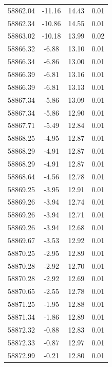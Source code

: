 \begin{longtable}{|c|c|c|c|}
 58862.04 &  -11.16 &       14.43 &          0.01 \\
 58862.34 &  -10.86 &       14.55 &          0.01 \\
 58863.02 &  -10.18 &       13.99 &          0.02 \\
 58866.32 &   -6.88 &       13.10 &          0.01 \\
 58866.34 &   -6.86 &       13.00 &          0.01 \\
 58866.39 &   -6.81 &       13.16 &          0.01 \\
 58866.39 &   -6.81 &       13.13 &          0.01 \\
 58867.34 &   -5.86 &       13.09 &          0.01 \\
 58867.34 &   -5.86 &       12.90 &          0.01 \\
 58867.71 &   -5.49 &       12.84 &          0.01 \\
 58868.25 &   -4.95 &       12.87 &          0.01 \\
 58868.29 &   -4.91 &       12.87 &          0.01 \\
 58868.29 &   -4.91 &       12.87 &          0.01 \\
 58868.64 &   -4.56 &       12.78 &          0.01 \\
 58869.25 &   -3.95 &       12.91 &          0.01 \\
 58869.26 &   -3.94 &       12.74 &          0.01 \\
 58869.26 &   -3.94 &       12.71 &          0.01 \\
 58869.26 &   -3.94 &       12.68 &          0.01 \\
 58869.67 &   -3.53 &       12.92 &          0.01 \\
 58870.25 &   -2.95 &       12.89 &          0.01 \\
 58870.28 &   -2.92 &       12.70 &          0.01 \\
 58870.28 &   -2.92 &       12.69 &          0.01 \\
 58870.65 &   -2.55 &       12.78 &          0.01 \\
 58871.25 &   -1.95 &       12.88 &          0.01 \\
 58871.34 &   -1.86 &       12.89 &          0.01 \\
 58872.32 &   -0.88 &       12.83 &          0.01 \\
 58872.33 &   -0.87 &       12.97 &          0.01 \\
 58872.99 &   -0.21 &       12.80 &          0.01 \\

\end{longtable}
